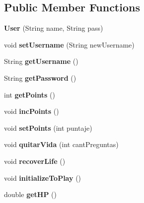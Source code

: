 \subsection*{Public Member Functions}
\begin{DoxyCompactItemize}
\item 
\mbox{\label{classtrivia_1_1User_a085f90f9229682286b48b07be6aea16b}} 
{\bfseries User} (String name, String pass)
\item 
\mbox{\label{classtrivia_1_1User_a375fc6f8791cb310799536e78f8a3cb3}} 
void {\bfseries set\+Username} (String new\+Username)
\item 
\mbox{\label{classtrivia_1_1User_a89c4c3989287003c38f90aa5b5e4bce0}} 
String {\bfseries get\+Username} ()
\item 
\mbox{\label{classtrivia_1_1User_a5ced9fd234d3401b005502a4d0645e78}} 
String {\bfseries get\+Password} ()
\item 
\mbox{\label{classtrivia_1_1User_a2f7ebdbc1c101511cbaebf58cd0703a3}} 
int {\bfseries get\+Points} ()
\item 
\mbox{\label{classtrivia_1_1User_a751eb03e51be76b13617bcbb461092f4}} 
void {\bfseries inc\+Points} ()
\item 
\mbox{\label{classtrivia_1_1User_a38c6549660cb21f8e7aacbe54cd188c0}} 
void {\bfseries set\+Points} (int puntaje)
\item 
\mbox{\label{classtrivia_1_1User_af5ea08746cb8d776250f307bd99340ae}} 
void {\bfseries quitar\+Vida} (int cant\+Preguntas)
\item 
\mbox{\label{classtrivia_1_1User_a17f8b7e6e9c874f097e8fa3677cbb620}} 
void {\bfseries recover\+Life} ()
\item 
\mbox{\label{classtrivia_1_1User_ade19e7e5e337d87be34cc2ebef96699d}} 
void {\bfseries initialize\+To\+Play} ()
\item 
\mbox{\label{classtrivia_1_1User_a2e20d3420cbed90e7e2c17db020fa0d3}} 
double {\bfseries get\+HP} ()
\end{DoxyCompactItemize}


